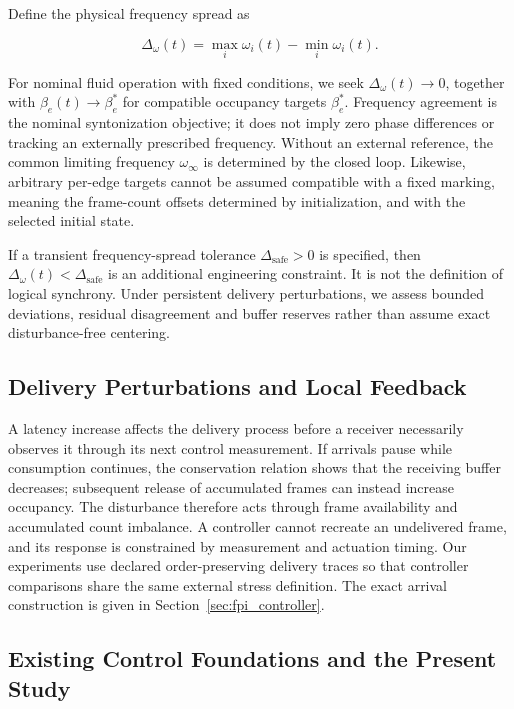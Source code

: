 Define the physical frequency spread as

\begin{equation}
\Delta_\omega(t)=\max_i\omega_i(t)-\min_i\omega_i(t).
\end{equation}

For nominal fluid operation with fixed conditions, we seek $\Delta_\omega(t)\to0$, together with $\beta_e(t)\to\beta_e^*$ for compatible occupancy targets $\beta_e^*$. Frequency agreement is the nominal syntonization objective; it does not imply zero phase differences or tracking an externally prescribed frequency. Without an external reference, the common limiting frequency $\omega_\infty$ is determined by the closed loop. Likewise, arbitrary per-edge targets cannot be assumed compatible with a fixed marking, meaning the frame-count offsets determined by initialization, and with the selected initial state.

If a transient frequency-spread tolerance $\Delta_{\mathrm{safe}}>0$ is specified, then $\Delta_\omega(t)<\Delta_{\mathrm{safe}}$ is an additional engineering constraint. It is not the definition of logical synchrony. Under persistent delivery perturbations, we assess bounded deviations, residual disagreement and buffer reserves rather than assume exact disturbance-free centering.

\subsection{Delivery Perturbations and Local Feedback}

A latency increase affects the delivery process before a receiver necessarily observes it through its next control measurement. If arrivals pause while consumption continues, the conservation relation shows that the receiving buffer decreases; subsequent release of accumulated frames can instead increase occupancy. The disturbance therefore acts through frame availability and accumulated count imbalance. A controller cannot recreate an undelivered frame, and its response is constrained by measurement and actuation timing. Our experiments use declared order-preserving delivery traces so that controller comparisons share the same external stress definition. The exact arrival construction is given in Section~\ref{sec:fpi_controller}.

\subsection{Existing Control Foundations and the Present Study}

